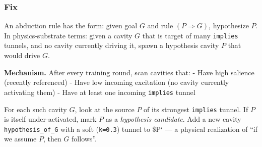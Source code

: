 \documentclass[
  11pt,
  a4paper,
]{article}
\begin{document}
\subsubsection{Fix}\label{fix-6}

An abduction rule has the form: given goal \(G\) and rule
\((P \Rightarrow G)\), hypothesize \(P\). In physics-substrate terms:
given a cavity \(G\) that is target of many \texttt{implies} tunnels,
and no cavity currently driving it, spawn a hypothesis cavity \(P\) that
would drive \(G\).

\textbf{Mechanism.} After every training round, scan cavities that: -
Have high salience (recently referenced) - Have low incoming excitation
(no cavity currently activating them) - Have at least one incoming
\texttt{implies} tunnel

For each such cavity \(G\), look at the source \(P\) of its strongest
\texttt{implies} tunnel. If \(P\) is itself under-activated, mark \(P\)
as a \emph{hypothesis candidate}. Add a new cavity
\texttt{hypothesis\_of\_G} with a soft (\texttt{k=0.3}) tunnel to \$P`
--- a physical realization of ``if we assume \(P\), then \(G\)
follows''.
\end{document}
